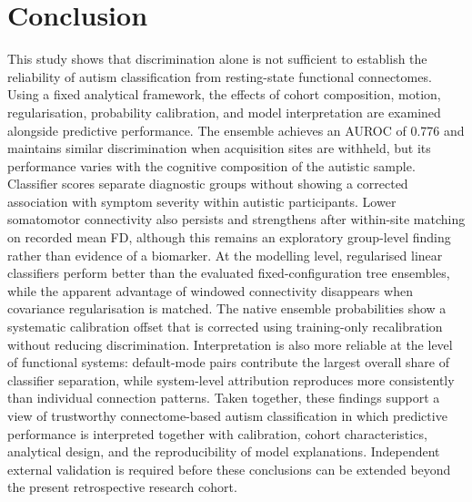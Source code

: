 \section{Conclusion}
\label{sec:conclusion}

This study shows that discrimination alone is not sufficient to establish the reliability of autism classification from resting-state functional connectomes. Using a fixed analytical framework, the effects of cohort composition, motion, regularisation, probability calibration, and model interpretation are examined alongside predictive performance. The ensemble achieves an AUROC of 0.776 and maintains similar discrimination when acquisition sites are withheld, but its performance varies with the cognitive composition of the autistic sample. Classifier scores separate diagnostic groups without showing a corrected association with symptom severity within autistic participants. Lower somatomotor connectivity also persists and strengthens after within-site matching on recorded mean FD, although this remains an exploratory group-level finding rather than evidence of a biomarker. At the modelling level, regularised linear classifiers perform better than the evaluated fixed-configuration tree ensembles, while the apparent advantage of windowed connectivity disappears when covariance regularisation is matched. The native ensemble probabilities show a systematic calibration offset that is corrected using training-only recalibration without reducing discrimination. Interpretation is also more reliable at the level of functional systems: default-mode pairs contribute the largest overall share of classifier separation, while system-level attribution reproduces more consistently than individual connection patterns. Taken together, these findings support a view of trustworthy connectome-based autism classification in which predictive performance is interpreted together with calibration, cohort characteristics, analytical design, and the reproducibility of model explanations. Independent external validation is required before these conclusions can be extended beyond the present retrospective research cohort.